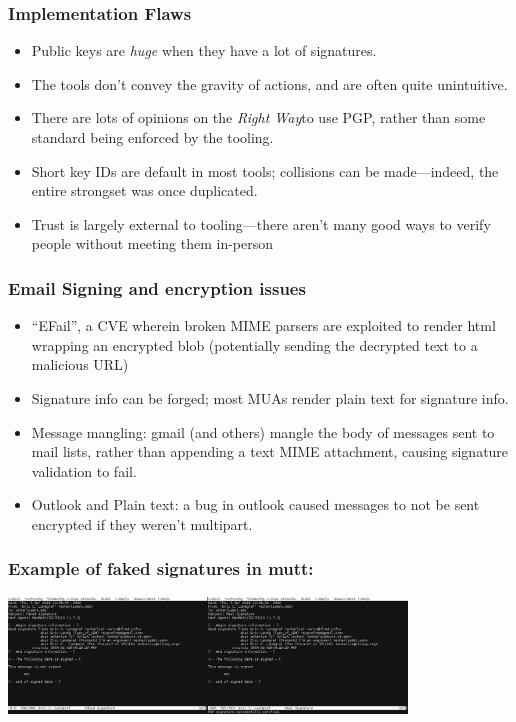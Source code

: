 \documentclass[aspectratio=1610,bigger,utf8]{beamer}
\begin{document}
\begin{frame}
	\frametitle{Implementation Flaws}
	\begin{itemize}
		\item Public keys are \emph{huge} when they have a lot of
			signatures.
		\item The tools don't convey the gravity of actions, and are
			often quite unintuitive.
		\item There are lots of opinions on the \emph{Right
			Way}\texttrademark to use PGP, rather than some
			standard being enforced by the tooling.
		\item Short key IDs are default in most tools; collisions can
			be made---indeed, the entire strongset was once duplicated.
		\item Trust is largely external to tooling---there aren't many
			good ways to verify people without meeting them
			in-person
	\end{itemize}
\end{frame}
\begin{frame}
	\frametitle{Email Signing and encryption issues}
	\begin{itemize}
		\item ``EFail'', a CVE wherein broken MIME parsers are
			exploited to render html wrapping an encrypted blob
			(potentially sending the decrypted text to a malicious
			URL)
		\item Signature info can be forged; most MUAs render plain text
			for signature info.
		\item Message mangling: gmail (and others) mangle the body of
			messages sent to mail lists, rather than appending a
			text MIME attachment, causing signature validation to
			fail.
		\item Outlook and Plain text: a bug in outlook caused messages
			to not be sent encrypted if they weren't multipart.
	\end{itemize}
\end{frame}
\begin{frame}
	\frametitle{Example of faked signatures in mutt:}
	\begin{center}
		\includegraphics[width=400px]{mutt}
	\end{center}
\end{frame}
\end{document}
